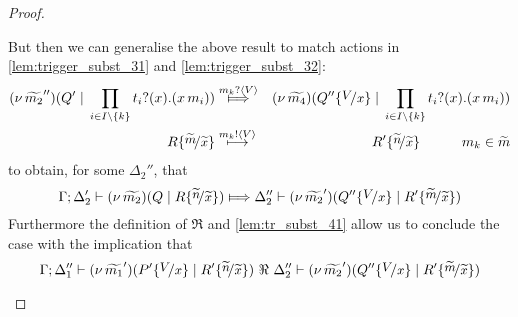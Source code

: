 \begin{proof}
\begin{enumerate}
\begin{enumerate}[i.]
							But then we can generalise the above result to match actions in \eqref{lem:trigger_subst_31}
							and \eqref{lem:trigger_subst_32}:
							\begin{eqnarray*}
								\newsp{\widetilde{m_2}''}{Q' \Par \prod_{i \in I\backslash{\set{k}}} \binp{t_i}{x} (\appl{x}{m_i})}
								&\Hby{\bactinp{m_k}{V}}&
								\newsp{\widetilde{m_4}}{Q'' \subst{V}{x} \Par \prod_{i \in I\backslash{\set{k}}} \binp{t_i}{x} (\appl{x}{m_i})}
								\\
								R \subst{\widetilde{m}}{\widetilde{x}}
								&\hby{\bactout{m_k}{V}}&
								R' \subst{\widetilde{n}}{\widetilde{x}} \qquad \quad m_k \in \widetilde{m}
							\end{eqnarray*}
							to obtain, for some $\Delta_2''$, that
							\[
								\horel{\Gamma}{\Delta_2'}{\newsp{\widetilde{m_2}}{Q \Par R \subst{\widetilde{n}}{\widetilde{x}} }}
								{\Hby{}}
								{\Delta_2''}{\newsp{\widetilde{m_2}'}{Q'' \subst{V}{x} \Par R' \subst{\widetilde{m}}{\widetilde{x}} }}
							\]
							Furthermore the definition of $\Re$ and \eqref{lem:tr_subst_41} allow us to
							conclude the case with the implication that
							\[
								\horel{\Gamma}{\Delta_1''}{\newsp{\widetilde{m_1}'}{P'\subst{V}{x} \Par R' \subst{\widetilde{n}}{\widetilde{x}} }}
								{\ \Re\ }
								{\Delta_2''}{\newsp{\widetilde{m_2}'}{Q'' \subst{V}{x} \Par R' \subst{\widetilde{m}}{\widetilde{x}} }}
							\]
			



\end{enumerate}
\end{enumerate}
\end{proof}
